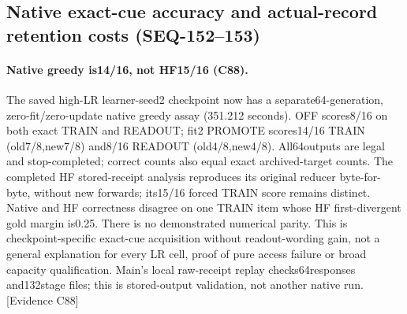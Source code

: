 \documentclass{article}
\begin{document}
\subsection{Native exact-cue accuracy and actual-record retention costs (SEQ-152--153)}
\label{sec:seq153-extension}
\paragraph{Native greedy is14/16, not HF15/16 (C88).}
The saved high-LR learner-seed2 checkpoint now has a separate64-generation,
zero-fit/zero-update native greedy assay (351.212 seconds). OFF scores8/16 on
both exact TRAIN and READOUT; fit2 PROMOTE scores14/16 TRAIN (old7/8,new7/8)
and8/16 READOUT (old4/8,new4/8). All64outputs are legal and stop-completed;
correct counts also equal exact archived-target counts. The completed HF
stored-receipt analysis reproduces its original reducer byte-for-byte, without
new forwards; its15/16 forced TRAIN score remains distinct. Native and HF
correctness disagree on one TRAIN item whose HF first-divergent gold margin
is0.25. There is no demonstrated numerical parity. This is checkpoint-specific
exact-cue acquisition without readout-wording gain, not a general explanation
for every LR cell, proof of pure access failure or broad capacity qualification.
Main's local raw-receipt replay checks64responses and132stage files; this is
stored-output validation, not another native run. \textsf{[Evidence C88]}
\end{document}
